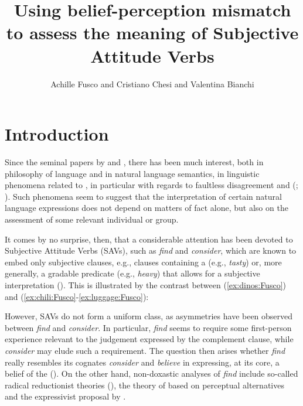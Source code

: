\documentclass[output=paper,colorlinks,citecolor=brown]{langscibook}
\author{Achille Fusco\orcid{0000-0002-5389-8884}\affiliation{NeTS Lab, IUSS Pavia} and        Cristiano Chesi\orcid{0000-0003-1935-1348}\affiliation{NeTS Lab, IUSS Pavia} and        Valentina Bianchi\orcid{0000-0002-4441-063X}\affiliation{University of Siena}}
\title[Assessing the meaning of Subjective Attitude Verbs]{Using belief-perception mismatch to assess the meaning of Subjective Attitude Verbs}
\begin{document}
\maketitle

\section{Introduction}
\label{sec:introduction:Fusco}

Since the seminal papers by \citet{lasersohn_2005} and \citet{kolbel_2004}, there has been much interest, both in philosophy of language and in natural language semantics, in linguistic phenomena related to , in particular with regards to faultless disagreement and  (; \cite{stephenson_judge_2007,stojanovic_2007,moltmann_2010,barker_2013,bylinina_thesis_2014, gunlogson_carlson_2016,munoz2019}). Such phenomena seem to suggest that the interpretation of certain natural language expressions does not depend on matters of fact alone, but also on the assessment of some relevant individual or group.

It comes by no surprise, then, that a considerable attention has been devoted to Subjective Attitude Verbs (SAVs), such as \textit{find} and \textit{consider}, which are known to embed only subjective clauses, e.g., clauses containing a  (e.g., \textit{tasty}) or, more generally, a gradable predicate (e.g., \textit{heavy}) that allows for a subjective interpretation (\cite{saebo_2009,kennedy_2013, bouchard_thesis_2012, fleisher_2013,coppock_2018,kennedy_willer_2022}). This is illustrated by the contrast between (\ref{ex:dinos:Fusco}) and (\ref{ex:chili:Fusco}-\ref{ex:luggage:Fusco}):

\z

\noindent{}However, SAVs do not form a uniform class, as asymmetries have been observed between \textit{find} and \textit{consider}. In particular, \textit{find} seems to require some first-person experience relevant to the judgement expressed by the complement clause, while \textit{consider} may elude such a requirement. The question then arises whether \textit{find} really resembles its cognates \textit{consider} and \textit{believe} in expressing, at its core, a belief of the  (\cite{stephenson_thesis_2007, fleisher_2013, kennedy_willer_2022, vardomskaya_2018, korotkova_anand_find_2021}).
On the other hand, non-doxastic analyses of \textit{find} include so-called radical reductionist theories (\cite{saebo_2009, bouchard_thesis_2012}), the theory of \citet{munoz2019} based  on perceptual alternatives and the expressivist proposal by \citet{franzen2020evaluative}.
\end{document}
